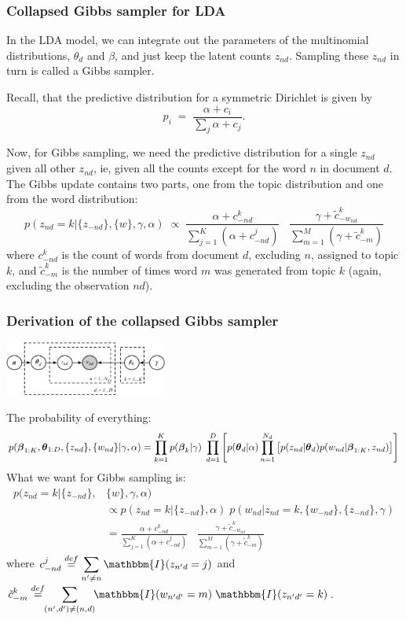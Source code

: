 \begin{frame}
\frametitle{Collapsed Gibbs sampler for LDA}

In the LDA model, we can integrate out the parameters of the multinomial
distributions, $\theta_d$ and $\beta$, and just keep the latent counts
$z_{nd}$. Sampling these $z_{nd}$ in turn is called a
 Gibbs sampler. 

Recall, that the predictive distribution for a symmetric Dirichlet is given by
\[
p_i\;=\;\frac{\alpha+c_i}{\sum_j \alpha + c_j}.
\]

Now, for Gibbs sampling, we need the predictive distribution for a
single $z_{nd}$ given all other $z_{nd}$, ie, given all the counts
except for the word $n$ in document $d$.\\
The Gibbs update contains two parts, one from the topic distribution
and one from the word distribution:
\[
p(z_{nd}=k|\{z_{-nd}\}, \{w\},\gamma, \alpha) \;\propto\;
 \frac{\alpha+c_{-nd}^k}{\displaystyle \sum_{j=1}^K (\alpha + c_{-nd}^j)} \;\;\;
\frac{\gamma + \tilde{c}_{-w_{nd}}^k}{\displaystyle \sum_{m=1}^M (\gamma +
  \tilde{c}_{-m}^k)}
\]
where $c^k_{-nd}$ is the count of words from document $d$, excluding
$n$, assigned 
to topic $k$, and  $\tilde{c}_{-m}^k$ is the number of times word $m$
was generated from topic $k$ (again, excluding the observation $nd$).
\end{frame}


\begin{frame}
\frametitle{Derivation of the collapsed Gibbs sampler}

\centerline{\includegraphics[width=0.4\textwidth]{lda2}}

The probability of everything:
{\small
\begin{align*}
p(\boldsymbol{\beta}_{1:K},\boldsymbol{\theta}_{1:D},\{z_{nd}\},\{w_{nd}\}|\gamma, \alpha)
=\prod_{k=1}^K p(\boldsymbol{\beta}_k|\gamma) \; \prod_{d=1}^D \left[ p(\boldsymbol{\theta}_d|\alpha)
\prod_{n=1}^{N_d} \big[
p(z_{nd}|\boldsymbol{\theta}_d)p(w_{nd}|\boldsymbol{\beta}_{1:K},z_{nd})\big] \right]
\end{align*}
}
What we want for Gibbs sampling is:
\begin{align*}
p(z_{nd}=k|\{z_{-nd}\},& \{w\},\gamma, \alpha)  \\
& \propto p(z_{nd}=k|\{ z_{-nd} \},\alpha) \;
p(w_{nd}|z_{nd}=k,\{w_{-nd}\},\{z_{-nd}\},\gamma)\\
& = \frac{\alpha+c_{-nd}^k}{\displaystyle \sum_{j=1}^K (\alpha + c_{-nd}^j)} \;\;\;
\frac{\gamma + \tilde{c}_{-w_{nd}}^k}{\displaystyle \sum_{m=1}^M (\gamma + \tilde{c}_{-m}^k)}
\end{align*}
{\small
where $\displaystyle c_{-nd}^j  \stackrel{def}{=}  \sum_{n' \neq n} 
\mathbbm{I}(z_{n'd} = j)$ and $\displaystyle \tilde{c}_{-m}^k \stackrel{def}{=} \!\!\sum_{(n',d')
  \neq (n,d)} \!\! \mathbbm{I}(w_{n'd'} = m) \; \mathbbm{I}(z_{n'd'} = k) $.
}

\end{frame}


